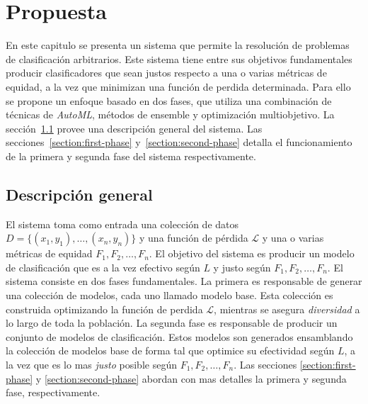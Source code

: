 \chapter{Propuesta}\label{chapter:proposal}

En este capitulo se presenta un sistema que permite la resolución de problemas de clasificación arbitrarios.
Este sistema tiene entre sus objetivos fundamentales producir clasificadores que sean justos respecto a una o varias métricas de equidad, a la vez que minimizan una función de perdida determinada.
Para ello se propone un enfoque basado en dos fases, que utiliza una combinación de técnicas de \emph{AutoML}, métodos de ensemble y optimización multiobjetivo.
La sección~\ref{section:overview} provee una descripción general del sistema.
Las secciones~\ref{section:first-phase} y~\ref{section:second-phase} detalla el funcionamiento de la primera y segunda fase del sistema respectivamente.

\section{Descripción general}\label{section:overview}

El sistema toma como entrada una colección de datos $D = \{(x_1, y_1), \dots , (x_n, y_n)\}$ y una función de pérdida $\mathcal{L}$ y una o varias métricas de equidad $F_1, F_2, \dots, F_n$.
El objetivo del sistema es producir un modelo de clasificación que es a la vez efectivo según $L$ y justo según $F_1, F_2, \dots, F_n$.
El sistema consiste en dos fases fundamentales.
La primera es responsable de generar una colección de modelos, cada uno llamado modelo base.
Esta colección es construida optimizando la función de perdida $\mathcal{L}$, mientras se asegura \emph{diversidad} a lo largo de toda la población.
La segunda fase es responsable de producir un conjunto de modelos de clasificación.
Estos modelos son generados ensamblando la colección de modelos base de forma tal que optimice su efectividad según $L$, a la vez que es lo mas \emph{justo} posible según $F_1, F_2, \dots, F_n$.
Las secciones \ref{section:first-phase} y \ref{section:second-phase} abordan con mas detalles la primera y segunda fase, respectivamente.



